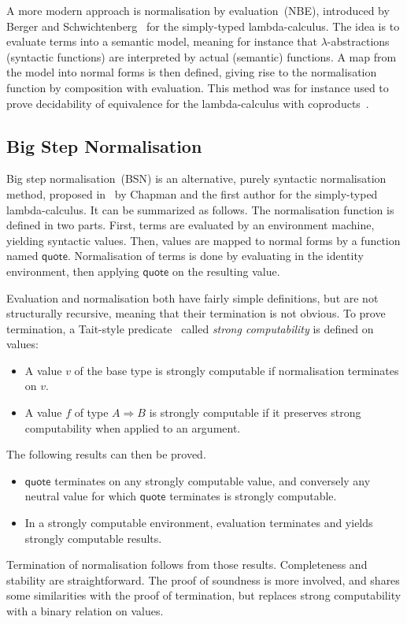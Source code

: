 \documentclass[a4paper,english]{lipics-v2019}
\newcommand{\agdaSymb}[1]{\mathsf{#1}}
\newcommand{\q}{\agdaSymb{quote}}
\newcommand{\Ra}{\Rightarrow}
\begin{document}
A more modern approach is normalisation by evaluation~(NBE), introduced
by Berger and Schwichtenberg~\cite{berger1991inverse} for the simply-typed
lambda-calculus. The idea is to evaluate terms into a semantic model,
meaning for instance that $\lambda$-abstractions (syntactic functions) are interpreted
by actual (semantic) functions. A map from the model into normal forms is then
defined, giving rise to the normalisation function by composition with evaluation.
This method was for instance used to prove decidability of equivalence for the
lambda-calculus with coproducts~\cite{altenkirch2001normalization}.

\subsection{Big Step Normalisation}
Big step normalisation~(BSN) is an alternative, purely syntactic
normalisation method, proposed in~\cite{chapman2009bsn} by Chapman and the
first author for the simply-typed lambda-calculus. It can be summarized as
follows.
The normalisation function is defined in two parts. First, terms are
evaluated by an environment machine, yielding syntactic values. Then, values are
mapped to normal forms by a function named $\q$. Normalisation of terms is done
by evaluating in the identity environment, then applying $\q$ on the resulting value.

Evaluation and normalisation both have fairly simple definitions, but are
not structurally recursive, meaning that their termination is not obvious.
To prove termination, a Tait-style predicate~\cite{tait1967} called
\emph{strong computability} is defined on values:
\begin{itemize}
\item A value $v$ of the base type is strongly computable if normalisation
  terminates on $v$.
\item A value $f$ of type $A \Ra B$ is strongly computable if it preserves
  strong computability when applied to an argument.
\end{itemize}
The following results can then be proved.
\begin{itemize}
\item $\q$ terminates on any strongly computable value, and conversely any
  neutral value for which $\q$ terminates is strongly computable.
\item In a strongly computable environment, evaluation terminates and yields
  strongly computable results.
\end{itemize}
Termination of normalisation follows from those results. Completeness and
stability are straightforward. The proof of soundness is more involved, and
shares some similarities with the proof of termination, but replaces strong
computability with a binary relation on values.
\end{document}
